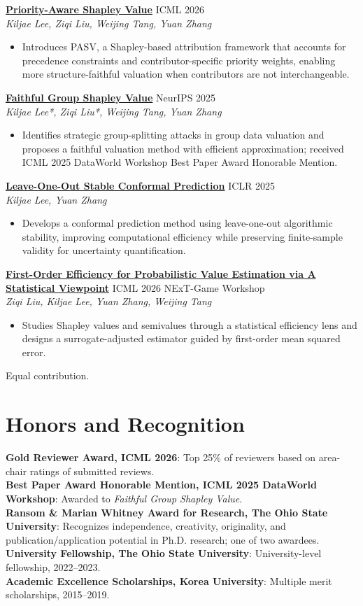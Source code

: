 \documentclass[letterpaper,10pt]{article}
\newcommand{\paperentry}[4]{%
  \textbf{#1} \hfill {\color{muted}#2}\\
  \textit{#3}\\[-2pt]
  \begin{itemize}
    \item #4
  \end{itemize}\vspace{1pt}
}
\newcommand{\awardentry}[2]{%
  \textbf{#1}: #2\\[-1pt]
}
\begin{document}
\paperentry
  {\href{https://arxiv.org/abs/2602.09326}{Priority-Aware Shapley Value}}
  {ICML 2026}
  {Kiljae Lee, Ziqi Liu, Weijing Tang, Yuan Zhang}
  {Introduces PASV, a Shapley-based attribution framework that accounts for precedence constraints and contributor-specific priority weights, enabling more structure-faithful valuation when contributors are not interchangeable.}

\paperentry
  {\href{https://arxiv.org/abs/2505.19013}{Faithful Group Shapley Value}}
  {NeurIPS 2025}
  {Kiljae Lee*, Ziqi Liu*, Weijing Tang, Yuan Zhang}
  {Identifies strategic group-splitting attacks in group data valuation and proposes a faithful valuation method with efficient approximation; received ICML 2025 DataWorld Workshop Best Paper Award Honorable Mention.}

\paperentry
  {\href{https://openreview.net/forum?id=Bt1vnCnAVS}{Leave-One-Out Stable Conformal Prediction}}
  {ICLR 2025}
  {Kiljae Lee, Yuan Zhang}
  {Develops a conformal prediction method using leave-one-out algorithmic stability, improving computational efficiency while preserving finite-sample validity for uncertainty quantification.}

\paperentry
  {\href{https://arxiv.org/abs/2605.02827}{First-Order Efficiency for Probabilistic Value Estimation via A Statistical Viewpoint}}
  {ICML 2026 NExT-Game Workshop}
  {Ziqi Liu, Kiljae Lee, Yuan Zhang, Weijing Tang}
  {Studies Shapley values and semivalues through a statistical efficiency lens and designs a surrogate-adjusted estimator guided by first-order mean squared error.}

{\footnotesize * Equal contribution.}

\section{Honors and Recognition}
\awardentry{Gold Reviewer Award, ICML 2026}{Top 25\% of reviewers based on area-chair ratings of submitted reviews.}
\awardentry{Best Paper Award Honorable Mention, ICML 2025 DataWorld Workshop}{Awarded to \textit{Faithful Group Shapley Value}.}
\awardentry{Ransom \& Marian Whitney Award for Research, The Ohio State University}{Recognizes independence, creativity, originality, and publication/application potential in Ph.D. research; one of two awardees.}
\awardentry{University Fellowship, The Ohio State University}{University-level fellowship, 2022--2023.}
\awardentry{Academic Excellence Scholarships, Korea University}{Multiple merit scholarships, 2015--2019.}
\end{document}
